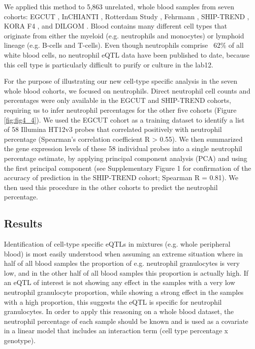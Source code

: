   We applied this method to 5,863 unrelated, whole blood samples from seven cohorts: EGCUT \cite{Metspalu:2004}, InCHIANTI 
  \cite{Tanaka:2009}, Rotterdam Study \cite{Hofman:2011}, Fehrmann \cite{Lude:2011}, SHIP-TREND 
  \cite{Teumer:2011}, KORA F4 \cite{Powell:2012, Mehta:2013}, and DILGOM \cite{Inouye:2010}. 
  Blood contains many different cell types that originate from either the myeloid (e.g. neutrophils and monocytes) or lymphoid lineage (e.g. B-cells and T-cells). 
  Even though neutrophils comprise ~62\% of all white blood cells, no neutrophil eQTL data have been published to date, because this cell type is particularly difficult 
  to purify or culture in the lab12. 

  For the purpose of illustrating our new cell-type specific analysis in the seven whole blood cohorts, we focused on neutrophils. 
  Direct neutrophil cell counts and percentages were only available in the EGCUT and SHIP-TREND cohorts, requiring us to infer 
  neutrophil percentages for the other five cohorts (Figure \ref{fig:fig4_4}). We used the EGCUT cohort as a training dataset to identify a list of 58 
  Illumina HT12v3 probes that correlated positively with neutrophil percentage (Spearman's correlation coefficient R > 0.55). 
  We then summarized the gene expression levels of these 58 individual probes into a single neutrophil percentage estimate, by 
  applying principal component analysis (PCA) and using the first principal component (see Supplementary Figure 1 for 
  confirmation of the accuracy of prediction in the SHIP-TREND cohort; Spearman R = 0.81). We then used this procedure in 
  the other cohorts to predict the neutrophil percentage.

  \subsection{Results}
  Identification of cell-type specific eQTLs in mixtures (e.g. whole peripheral blood) is most easily 
  understood when assuming an extreme situation where in half of all blood samples the proportion of 
  e.g. neutrophil granulocytes is very low, and in the other half of all blood samples this proportion 
  is actually high. If an eQTL of interest is not showing any effect in the samples with a very low 
  neutrophil granulocyte proportion, while showing a strong effect in the samples with a high proportion, 
  this suggests the eQTL is specific for neutrophil granulocytes. In order to apply this reasoning on 
  a whole blood dataset, the neutrophil percentage of each sample should be known and is used as a 
  covariate in a linear model that includes an interaction term (cell type percentage x genotype). 

